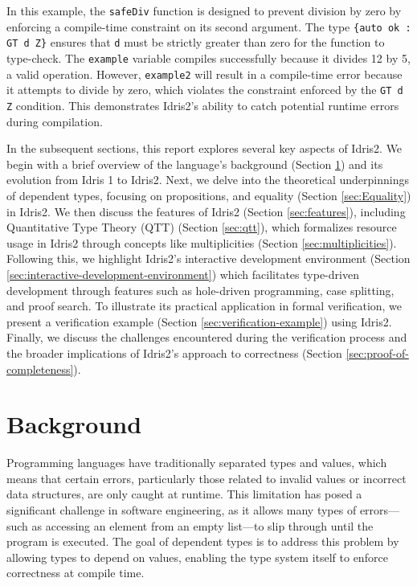 \documentclass[]{rptuseminar}
\begin{document}
In this example, the \texttt{safeDiv} function is designed to prevent division by zero by enforcing a compile-time constraint on its second argument. The type \texttt{\{auto ok : GT d Z\}} ensures that \texttt{d} must be strictly greater than zero for the function to type-check. The \texttt{example} variable compiles successfully because it divides 12 by 5, a valid operation. However, \texttt{example2} will result in a compile-time error because it attempts to divide by zero, which violates the constraint enforced by the \texttt{GT d Z} condition. This demonstrates Idris2's ability to catch potential runtime errors during compilation.

In the subsequent sections, this report explores several key aspects of Idris2.
We begin with a brief overview of the language's background (Section \ref{sec:background}) and its evolution from Idris 1 to Idris2. Next, we delve into the theoretical underpinnings of dependent types, focusing on propositions, and equality (Section \ref{sec:Equality}) in Idris2. We then discuss the features of Idris2 (Section \ref{sec:features}), including Quantitative Type Theory (QTT) (Section \ref{sec:qtt}), which formalizes resource usage in Idris2 through concepts like multiplicities (Section \ref{sec:multiplicities}). Following this, we highlight Idris2's interactive development environment (Section \ref{sec:interactive-development-environment}) which facilitates type-driven development through features such as hole-driven programming, case splitting, and proof search. To illustrate its practical application in formal verification, we present a verification example (Section \ref{sec:verification-example}) using Idris2. Finally, we discuss the challenges encountered during the verification process and the broader implications of Idris2's approach to correctness (Section \ref{sec:proof-of-completeness}).

\section{Background}  
\label{sec:background}  

Programming languages have traditionally separated types and values, which means that certain errors, particularly those related to invalid values or incorrect data structures, are only caught at runtime. This limitation has posed a significant challenge in software engineering, as it allows many types of errors—such as accessing an element from an empty list—to slip through until the program is executed. The goal of dependent types is to address this problem by allowing types to depend on values, enabling the type system itself to enforce correctness at compile time.
\end{document}
